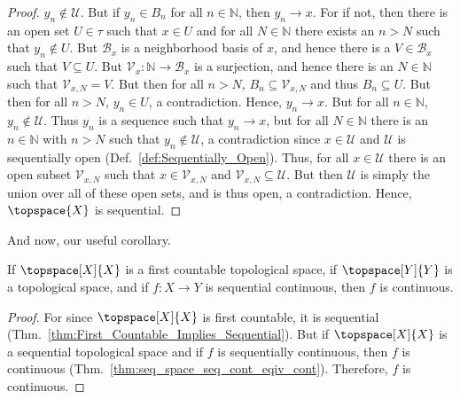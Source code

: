 \documentclass{article}                                                        %
\begin{document}
\begin{proof}
                $y_{n}\notin\mathcal{U}$. But if $y_{n}\in{B}_{n}$ for all
                $n\in\mathbb{N}$, then $y_{n}\rightarrow{x}$. For if not, then there
                is an open set $U\in\tau$ such that $x\in{U}$ and for all
                $N\in\mathbb{N}$ there exists an $n>N$ such that $y_{n}\notin{U}$.
                But $\mathcal{B}_{x}$ is a neighborhood basis of $x$, and hence
                there is a $V\in\mathcal{B}_{x}$ such that $V\subseteq{U}$. But
                $\mathcal{V}_{x}:\mathbb{N}\rightarrow\mathcal{B}_{x}$ is a
                surjection, and hence there is an $N\in\mathbb{N}$ such that
                $\mathcal{V}_{x,N}=V$. But then for all $n>N$,
                $B_{n}\subseteq\mathcal{V}_{x,N}$ and thus $B_{n}\subseteq{U}$.
                But then for all $n>N$, $y_{n}\in{U}$, a contradiction. Hence,
                $y_{n}\rightarrow{x}$. But for all $n\in\mathbb{N}$,
                $y_{n}\notin\mathcal{U}$. Thus $y_{n}$ is a sequence such that
                $y_{n}\rightarrow{x}$, but for all $N\in\mathbb{N}$ there is an
                $n\in\mathbb{N}$ with $n>N$ such that $y_{n}\notin\mathcal{U}$, a
                contradiction since $x\in\mathcal{U}$ and $\mathcal{U}$ is
                sequentially open (Def.~\ref{def:Sequentially_Open}). Thus, for all
                $x\in\mathcal{U}$ there is an open subset $\mathcal{V}_{x,N}$ such
                that $x\in\mathcal{V}_{x,N}$ and
                $\mathcal{V}_{x,N}\subseteq\mathcal{U}$. But then $\mathcal{U}$ is
                simply the union over all of these open sets, and is thus open,
                a contradiction. Hence, $\topspace{X}$ is sequential.
            \end{proof}
            And now, our useful corollary.
            \begin{theorem}
                \label{thm:First_Countable_Implies_Seq_Cont_is_Cont}%
                If $\topspace[X]{X}$ is a first countable topological space, if
                $\topspace[Y]{Y}$ is a topological space, and if $f:X\rightarrow{Y}$
                is sequential continuous, then $f$ is continuous.
            \end{theorem}
            \begin{proof}
                For since $\topspace[X]{X}$ is first countable, it is sequential
                (Thm.~\ref{thm:First_Countable_Implies_Sequential}). But if
                $\topspace[X]{X}$ is a sequential topological space and if $f$ is
                sequentially continuous, then $f$ is continuous
                (Thm.~\ref{thm:seq_space_seq_cont_eqiv_cont}). Therefore, $f$ is
                continuous.
            \end{proof}
\end{document}
